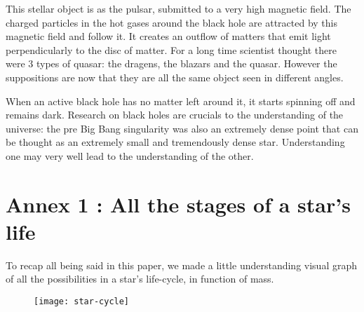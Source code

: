 \documentclass[a4paper, 11pt]{article} %
\begin{document}
This stellar object is as the pulsar, submitted to a very high magnetic field. The charged particles in the hot gases around the black hole are attracted by this magnetic field and follow it. It creates an outflow of matters that emit light perpendicularly to the disc of matter. For a long time scientist thought there were 3 types of quasar: the dragens, the blazars and the quasar. However the suppositions are now that they are all the same object seen in different angles.

When an active black hole has no matter left around it, it starts spinning off and remains dark. Research on black holes are crucials to the understanding of the universe: the pre Big Bang singularity was also an extremely dense point that can be thought as an extremely small and tremendously dense star. Understanding one may very well lead to the understanding of the other. 

\newpage



\section*{Annex 1 : All the stages of a star's life}

To recap all being said in this paper, we made a little understanding visual graph of all the possibilities in a star's life-cycle, in function of mass.



\begin{figure}[h]
\centering


\texttt{[image: star-cycle]}
\end{figure}
\newpage
\end{document}
